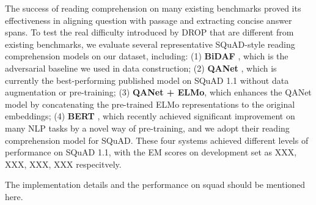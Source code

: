 The success of reading comprehension on many existing benchmarks proved its effectiveness in aligning question with passage and extracting concise answer spans. 
To test the real difficulty introduced by DROP that are different from existing benchmarks, we evaluate several representative SQuAD-style reading comprehension models on our dataset, including:
(1) \textbf{BiDAF} \cite{Seo2016BidirectionalAF}, which is the adversarial baseline we used in data construction; 
(2) \textbf{QANet} \cite{yu2018qanet}, which is currently the best-performing published model on SQuAD 1.1 without data augmentation or pre-training; 
(3) \textbf{QANet + ELMo}, which enhances the QANet model by concatenating the pre-trained ELMo \cite{peters2018elmo} representations to the original embeddings; 
(4) \textbf{BERT} \cite{Devlin2018BERTPO}, which recently achieved significant improvement on many NLP tasks by a novel way of pre-training, and we adopt their reading comprehension model for SQuAD. 
These four systems achieved different levels of performance on SQuAD 1.1, with the EM scores on development set as XXX, XXX, XXX, XXX respecitvely.


The implementation details and the performance on squad should be mentioned here.